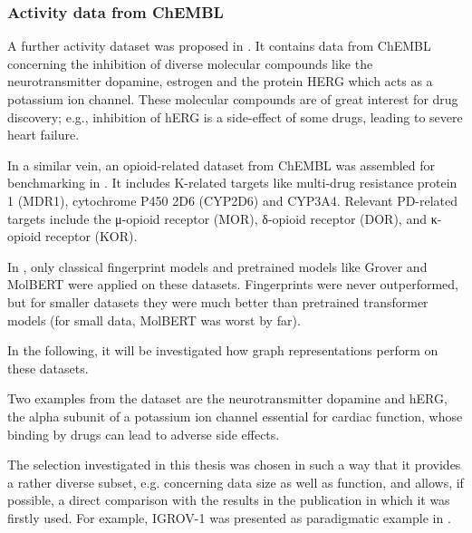 \subsubsection{Activity data from ChEMBL}


A further activity dataset was proposed in \cite{CortesCiriano.2019}. It contains data from ChEMBL concerning the inhibition of diverse molecular compounds like the neurotransmitter dopamine, estrogen and the protein HERG which acts as a potassium ion channel. These molecular compounds are of great interest for drug discovery; e.g., inhibition of hERG is a side-effect of some drugs, leading to severe heart failure. 

In a similar vein, an opioid-related dataset from ChEMBL was assembled for benchmarking in \cite{Deng.2023}. It includes K-related targets like multi-drug resistance protein 1 (MDR1), cytochrome P450 2D6 (CYP2D6) and CYP3A4. Relevant PD-related targets include the μ-opioid receptor (MOR), δ-opioid receptor (DOR), and κ-opioid receptor (KOR).

In \cite{Deng.2023}, only classical fingerprint models and pretrained models like Grover and MolBERT were applied on these datasets. Fingerprints were never outperformed, but for smaller datasets they were much better than pretrained transformer models (for small data, MolBERT was worst by far). 

In the following, it will be investigated how graph representations perform on these datasets.

Two examples from the dataset are the neurotransmitter dopamine and hERG, the alpha subunit of a potassium ion channel essential for cardiac function, whose binding by drugs can lead to adverse side effects.

The selection investigated in this thesis was chosen in such a way that it provides a rather diverse subset, e.g. concerning data size as well as function, and allows, if possible, a direct comparison with the results in the publication in which it was firstly used. For example, IGROV-1 was presented as paradigmatic example in \cite{Zhang.2024}.

